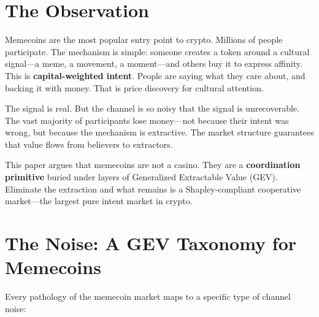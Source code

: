 \documentclass[9pt, letterpaper]{article}
\begin{document}

\section{The Observation}

Memecoins are the most popular entry point to crypto. Millions of people participate. The mechanism is simple: someone creates a token around a cultural signal---a meme, a movement, a moment---and others buy it to express affinity. This is \textbf{capital-weighted intent}. People are saying what they care about, and backing it with money. That is price discovery for cultural attention.

The signal is real. But the channel is so noisy that the signal is unrecoverable. The vast majority of participants lose money---not because their intent was wrong, but because the mechanism is extractive. The market structure guarantees that value flows from believers to extractors.

This paper argues that memecoins are not a casino. They are a \textbf{coordination primitive} buried under layers of Generalized Extractable Value (GEV). Eliminate the extraction and what remains is a Shapley-compliant cooperative market---the largest pure intent market in crypto.


\section{The Noise: A GEV Taxonomy for Memecoins}

Every pathology of the memecoin market maps to a specific type of channel noise:
\end{document}
